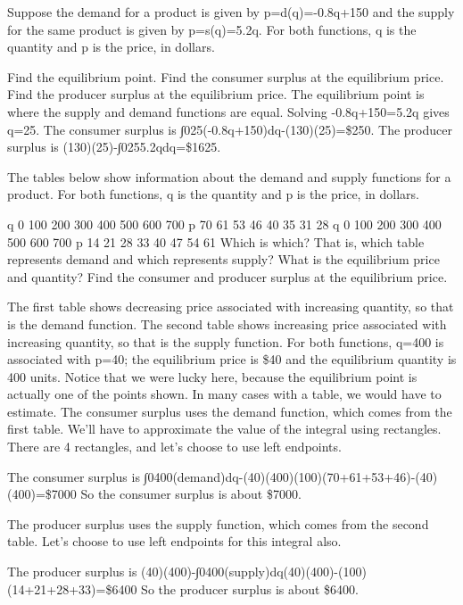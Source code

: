 \begin{example}
Suppose the demand for a product is given by p=d(q)=-0.8q+150 and the supply for the same product is given by p=s(q)=5.2q. For both functions, q is the quantity and p is the price, in dollars.

\begin{solution}
  Find the equilibrium point.
Find the consumer surplus at the equilibrium price.
Find the producer surplus at the equilibrium price.
The equilibrium point is where the supply and demand functions are equal. Solving -0.8q+150=5.2q gives q=25.
The consumer surplus is
∫025(-0.8q+150)dq-(130)(25)=\$250.
The producer surplus is
(130)(25)-∫0255.2qdq=\$1625.
\end{solution}\end{example}

\begin{example}
The tables below show information about the demand and supply functions for a product. For both functions, q is the quantity and p is the price, in dollars.

q	0	100	200	300	400	500	600	700	p	70	61	53	46	40	35	31	28
q	0	100	200	300	400	500	600	700	p	14	21	28	33	40	47	54	61
Which is which? That is, which table represents demand and which represents supply?
What is the equilibrium price and quantity?
Find the consumer and producer surplus at the equilibrium price.

\begin{solution}
The first table shows decreasing price associated with increasing quantity, so that is the demand function. The second table shows increasing price associated with increasing quantity, so that is the supply function.
For both functions, q=400 is associated with p=40; the equilibrium price is \$40 and the equilibrium quantity is 400 units. Notice that we were lucky here, because the equilibrium point is actually one of the points shown. In many cases with a table, we would have to estimate.
The consumer surplus uses the demand function, which comes from the first table. We'll have to approximate the value of the integral using rectangles. There are 4 rectangles, and let's choose to use left endpoints.

The consumer surplus is
∫0400(demand)dq-(40)(400)\approx   (100)(70+61+53+46)-(40)(400)=\$7000
So the consumer surplus is about \$7000.

The producer surplus uses the supply function, which comes from the second table. Let's choose to use left endpoints for this integral also.

The producer surplus is
(40)(400)-∫0400(supply)dq\approx   (40)(400)-(100)(14+21+28+33)=\$6400
So the producer surplus is about \$6400.
\end{solution}\end{example}

